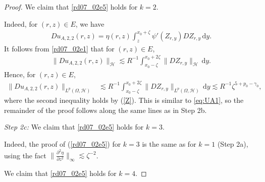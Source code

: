 \documentclass[10pt,a4paper]{amsart}
\newcommand {\deltah}{{\zeta}}
\newcommand{\E}{\mathrm{E}}
\newcommand{\R}{{\mathbb{R}}}
\renewcommand{\d}{\mathrm{d}}
\begin{document}
\begin{proof}
           We claim that \eqref{rd07_02e5} holds for $k=2$.
  
Indeed, for $(r,z)\in E$, we have
           \begin{align*}
           Du_{A,2,2}(r,z) = \eta(r,z) \int_z^{x_0+\deltah} \psi'(Z_{r,y})DZ_{r,y} \, \d y. 
           \end{align*}
           It follows from \eqref{rd07_02e1} that for $(r,z)\in E$,
           \begin{align*}
           \|Du_{A,2,2}(r,z)\|_{\mathcal{H}} \lesssim R^{-1}\int_{x_0-\deltah}^{x_0+2\deltah}\|DZ_{r,y}\|_{\mathcal{H}}\, \d y.
           \end{align*}
           Hence, for $(r,z)\in E$,
           \begin{align*}
           \|Du_{A,2,2}(r,z)\|_{L^p(\Omega,\mathcal{H})}& \lesssim 
           R^{-1}\int_{x_0-\deltah}^{x_0+2\deltah}\|DZ_{r,y}\|_{L^p(\Omega, \mathcal{H})}\, \d y
           \lesssim R^{-1}\deltah^{5+p_0-\gamma_0},
           \end{align*}
           where the second inequality holds by (\ref{Z}). This is similar to \eqref{eq:UA1}, so the remainder of the proof follows along the same lines 
           as in Step 2b.
   \medskip
   
 \noindent
 {\it Step 2c:}
We claim that \eqref{rd07_02e5} holds for $k=3$.
  
 Indeed, the proof of (\ref{rd07_02e5}) for $k=3$ is the same as for $k=1$ (Step 2a), using the fact $\|\frac{\partial^2 \eta}{\partial z^2}\|_\infty\lesssim \deltah^{-2}$.
 
  \medskip
  
           We claim that \eqref{rd07_02e5} holds for $k=4$.


\end{proof}
\end{document}
